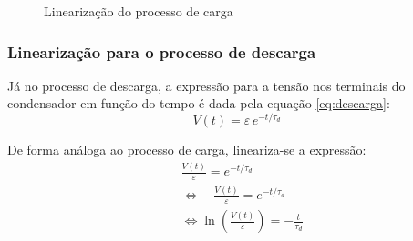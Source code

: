 \begin{figure}[!ht]
	\centering
	\caption{Linearização do processo de carga}
	\label{gra:lin-carga}
\end{figure}

\subsubsection{Linearização para o processo de descarga}

Já no processo de descarga, a expressão para a tensão nos terminais do condensador em função do tempo é dada pela equação \cref{eq:descarga}:
\begin{equation} \label{eq:descarga}
	V(t) = \varepsilon\, e^{-t/\tau_d}
\end{equation}

De forma análoga ao processo de carga, lineariza-se a expressão:
\begin{align*}
	 & \frac{V(t)}{\varepsilon} = e^{-t/\tau_d}                                     \\
	 & \Leftrightarrow \quad \frac{V(t)}{\varepsilon} = e^{-t/\tau_d}               \\
	 & \Leftrightarrow\ln\left(\frac{V(t)}{\varepsilon}\right) = - \frac{t}{\tau_d} \\
\end{align*}

